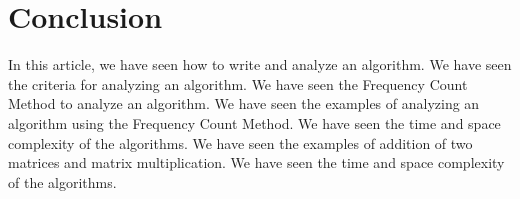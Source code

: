 \documentclass[twocolumn]{article}
\begin{document}
\section{Conclusion}
In this article, we have seen how to write and analyze an algorithm. We have seen the criteria for analyzing an algorithm. We have seen the Frequency Count Method to analyze an algorithm. We have seen the examples of analyzing an algorithm using the Frequency Count Method. We have seen the time and space complexity of the algorithms. We have seen the examples of addition of two matrices and matrix multiplication. We have seen the time and space complexity of the algorithms.
\end{document}
